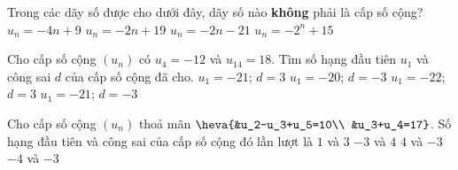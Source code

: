 \begin{ex}%
	Trong các dãy số được cho dưới đây, dãy số nào {\bf không} phải là cấp số cộng?
	\choice
	{$u_n=-4n+9$}
	{$u_n=-2n+19$}
	{$u_n=-2n-21$}
	{\True $u_n=-2^n+15$}
\end{ex}

\begin{ex}%
	Cho cấp số cộng $(u_n)$ có $u_4=-12$ và $u_{14}=18$. Tìm số hạng đầu tiên $u_1$ và công sai $d$ của cấp số cộng đã cho.
	\choice
	{\True $u_1=-21$; $d=3$}
	{$u_1=-20$; $d=-3$}
	{$u_1=-22$; $d=3$}
	{$u_1=-21$; $d=-3$}
\end{ex}

\begin{ex}%
	Cho cấp số cộng $(u_n)$ thoả mãn $\heva{&u_2-u_3+u_5=10\\ &u_3+u_4=17}$. Số hạng đầu tiên và công sai của cấp số cộng đó lần lượt là
	\choice
	{\True $1$ và $3$}
	{$-3$ và $4$}
	{$4$ và $-3$}
	{$-4$ và $-3$}
\end{ex}

